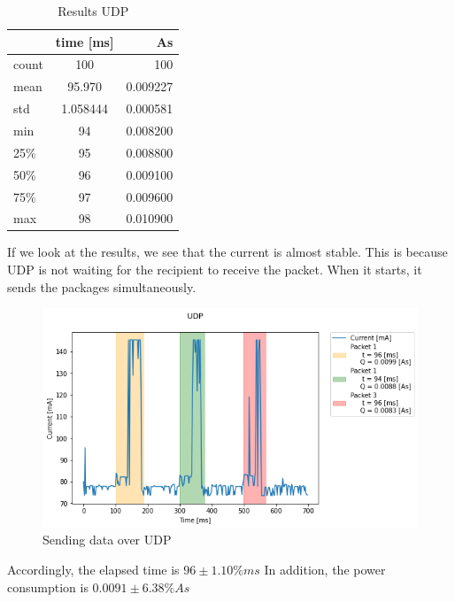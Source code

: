 \begin{table}[H]
    \begin{center}
        \caption{Results UDP}
        \label{tab:table2}
        \begin{tabular}{|l|c|r|}
            \hline
            & \textbf{time [ms]} & \textbf{As}\\
            \hline
            count & 100 & 100\\
            mean & 95.970 & 0.009227\\
            std & 1.058444 & 0.000581\\
            min & 94 & 0.008200\\
            25\% & 95 & 0.008800\\
            50\% & 96 & 0.009100\\
            75\% & 97 & 0.009600\\
            max & 98 & 0.010900\\
            \hline
        \end{tabular}
    \end{center}
\end{table}

If we look at the results, we see that the current is almost stable.
This is because UDP is not waiting for the recipient to receive the packet.
When it starts, it sends the packages simultaneously.
\begin{figure}[H]
    \centering
    \includegraphics[width = 1 \linewidth]{fig/udp_tcp/udp_s_m.png}
    \caption{Sending data over UDP}
    \label{fig:udp_s_m}
\end{figure}
Accordingly, the elapsed time is $96 \pm 1.10\% ms$
In addition, the power consumption is $0.0091 \pm 6.38\% As$
